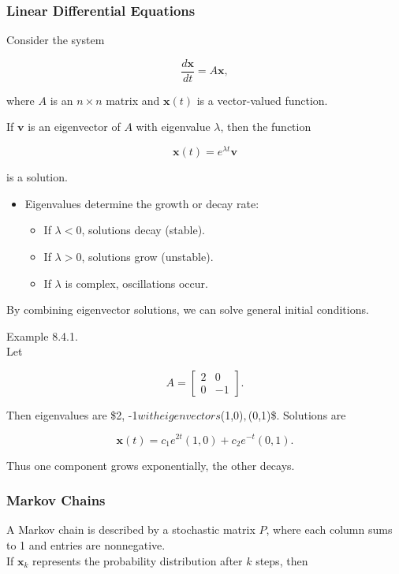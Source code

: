 \documentclass[
  12pt,
  a4paper,
]{article}
\begin{document}
\subsubsection{Linear Differential
Equations}\label{linear-differential-equations}

Consider the system

\[\frac{d\mathbf{x}}{dt} = A \mathbf{x},\]

where \(A\) is an \(n \times n\) matrix and \(\mathbf{x}(t)\) is a
vector-valued function.

If \(\mathbf{v}\) is an eigenvector of \(A\) with eigenvalue
\(\lambda\), then the function

\[\mathbf{x}(t) = e^{\lambda t}\mathbf{v}\]

is a solution.

\begin{itemize}
\item
  Eigenvalues determine the growth or decay rate:

  \begin{itemize}
  \item
    If \(\lambda < 0\), solutions decay (stable).
  \item
    If \(\lambda > 0\), solutions grow (unstable).
  \item
    If \(\lambda\) is complex, oscillations occur.
  \end{itemize}
\end{itemize}

By combining eigenvector solutions, we can solve general initial
conditions.

Example 8.4.1.\\
Let

\[A = \begin{bmatrix}
2 & 0 \\
0 & -1 \end{bmatrix}.\]

Then eigenvalues are \$2, -1\( with eigenvectors \)(1,0)\(, \)(0,1)\$.
Solutions are

\[\mathbf{x}(t) = c_1 e^{2t}(1,0) + c_2 e^{-t}(0,1).\]

Thus one component grows exponentially, the other decays.

\subsubsection{Markov Chains}\label{markov-chains}

A Markov chain is described by a stochastic matrix \(P\), where each
column sums to 1 and entries are nonnegative.\\
If \(\mathbf{x}_k\) represents the probability distribution after \(k\)
steps, then
\end{document}
